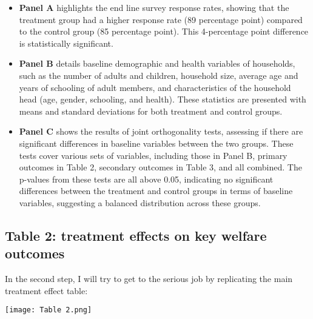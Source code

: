 \documentclass{article}
\begin{document}
\begin{itemize}

    \item  \textbf{Panel A} highlights the end line survey response rates, showing that the treatment group had a higher response rate (89 percentage point) compared to the control group (85 percentage point). This 4-percentage point difference is statistically significant.

    \item \textbf{Panel B} details baseline demographic and health variables of households, such as the number of adults and children, household size, average age and years of schooling of adult members, and characteristics of the household head (age, gender, schooling, and health). These statistics are presented with means and standard deviations for both treatment and control groups.

    \item \textbf{Panel C} shows the results of joint orthogonality tests, assessing if there are significant differences in baseline variables between the two groups. These tests cover various sets of variables, including those in Panel B, primary outcomes in Table 2, secondary outcomes in Table 3, and all combined. The p-values from these tests are all above 0.05, indicating no significant differences between the treatment and control groups in terms of baseline variables, suggesting a balanced distribution across these groups.

\end{itemize}




\subsection{Table 2: treatment effects on key welfare outcomes}
 
In the second step, I will try to get to the serious job by replicating the main treatment effect table: 

\texttt{[image: Table 2.png]}
\end{document}

